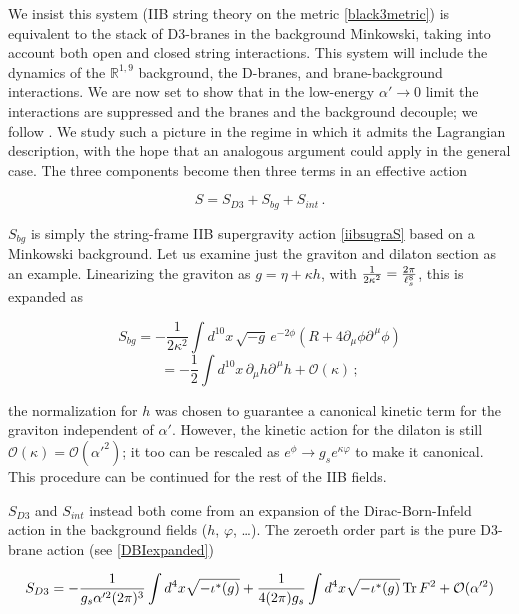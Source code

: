 We insist this system (IIB string theory on the metric \ref{black3metric}) is equivalent to the stack of D3-branes in the background Minkowski, taking into account both open and closed string interactions. This system will include the dynamics of the $\mathbb{R}^{1,9}$ background, the D-branes, and brane-background interactions. We are now set to show that in the low-energy $\alpha' \rightarrow 0$ limit the interactions are suppressed and the branes and the background decouple; we follow \cite{erdmenger}. We study such a picture in the regime in which it admits the Lagrangian description, with the hope that an analogous argument could apply in the general case. The three components become then three terms in an effective action

\begin{equation}
	S = S_{D3} + S_{bg} + S_{int}\,.
	\label{}
\end{equation}

$S_{bg}$ is simply the string-frame IIB supergravity action \eqref{iibsugraS} based on a Minkowski background. Let us examine just the graviton and dilaton section as an example. Linearizing the graviton as $g = \eta + \kappa h$, with $\frac{1}{2\kappa^2} = \frac{2\pi}{\ell_s^8}$, this is expanded as

\begin{equation}
	S_{bg} = - \frac{1}{2\kappa^2} \int d^{10}x \, \sqrt{-g} \, e^{-2\phi} (R + 4 \partial_\mu \phi \partial^{\,\mu} \phi) 
\end{equation}
\begin{equation}
	= - \frac{1}{2} \int d^{10} x \, \partial_\mu h \partial^{\,\mu} h + \mathcal{O}(\kappa)\,;
	\label{}
\end{equation}

the normalization for $h$ was chosen to guarantee a canonical kinetic term for the graviton independent of $\alpha'$. However, the kinetic action for the dilaton is still $\mathcal{O}(\kappa) = \mathcal{O}(\alpha'^2)$; it too can be rescaled as $e^\phi \rightarrow g_s e^{\kappa \varphi}$ to make it canonical. This procedure can be continued for the rest of the IIB fields.

$S_{D3}$ and $S_{int}$ instead both come from an expansion of the Dirac-Born-Infeld action in the background fields ($h$, $\varphi$, \ldots). The zeroeth order part is the pure D3-brane action (see \eqref{DBIexpanded})

\begin{equation}
	S_{D3} = - \frac{1}{g_s \alpha'^2 (2\pi)^3} \int d^4 x \sqrt{-\iota^*(g)} + \frac{1}{4(2\pi)g_s} \int d^4 x \sqrt{-\iota^*(g)} \operatorname{Tr} F^2 + \mathcal{O}(\alpha'^2)
	\label{}
\end{equation}

